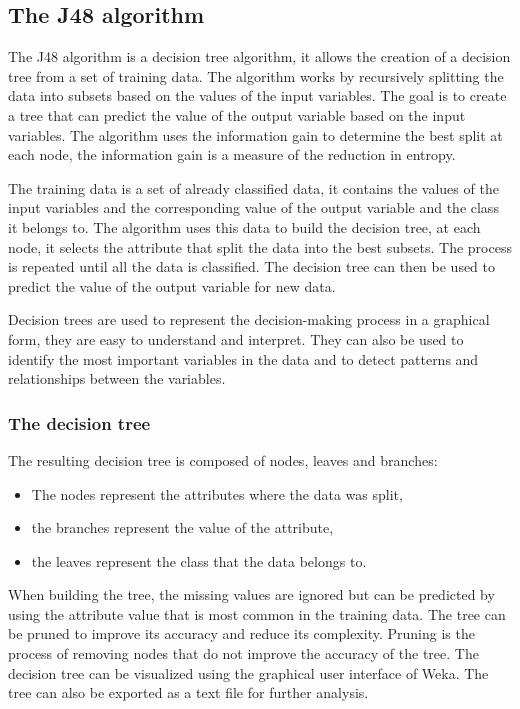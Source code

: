 \subsection{The J48 algorithm}
\label{subsec:j48}

The J48 algorithm is a decision tree algorithm, it allows the creation of a decision tree from a set of training data. The
algorithm works by recursively splitting the data into subsets based on the values of the input variables. The goal is to
create a tree that can predict the value of the output variable based on the input variables. The algorithm uses the
information gain to determine the best split at each node, the information gain is a measure of the reduction in entropy.

The training data is a set of already classified data, it contains the values of the input variables and the corresponding
value of the output variable and the class it belongs to. The algorithm uses this data to build the decision tree, at each
node, it selects the attribute that split the data into the best subsets. The process is repeated until all the data is
classified. The decision tree can then be used to predict the value of the output variable for new data.

Decision trees are used to represent the decision-making process in a graphical form, they are easy to understand and
interpret. They can also be used to identify the most important variables in the data and to detect patterns and
relationships between the variables.

\subsubsection{The decision tree}
\label{subsubsec:decision-tree}

The resulting decision tree is composed of nodes, leaves and branches:
\begin{itemize}
	\item The nodes represent the attributes where the data was split,
	\item the branches represent the value of the attribute,
	\item the leaves represent the class that the data belongs to.
\end{itemize}

When building the tree, the missing values are ignored but can be predicted by using the attribute value that is most
common in the training data. The tree can be pruned to improve its accuracy and reduce its complexity. Pruning is the
process of removing nodes that do not improve the accuracy of the tree. The decision tree can be visualized using the
graphical user interface of Weka. The tree can also be exported as a text file for further analysis.

